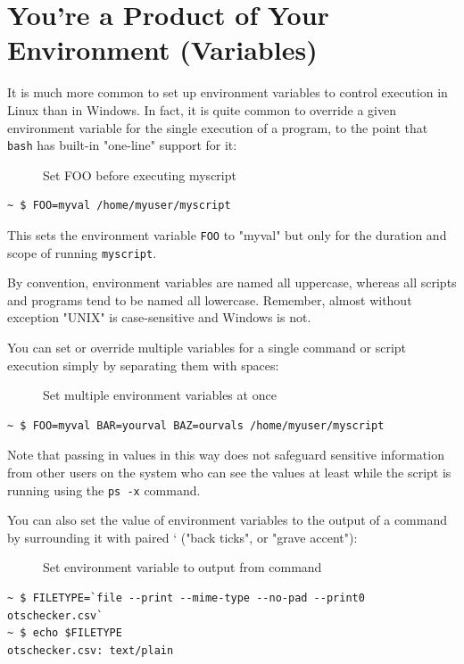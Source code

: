 \documentclass[10pt,]{book}
\numberwithin{figure}{chapter}
\DeclareRobustCommand{\drcap}[1]{\begin{figure}[H]\caption{#1}\end{figure}}
\begin{document}
\section*{You're a Product of Your Environment
(Variables)}\label{youre-a-product-of-your-environment-variables}

It is much more common to set up environment variables to control
execution in Linux than in Windows. In fact, it is quite common to
override a given environment variable for the single execution of a
program, to the point that \texttt{bash} has built-in "one-line" support
for it:

\drcap{Set FOO before executing myscript}

\begin{verbatim}
~ $ FOO=myval /home/myuser/myscript
\end{verbatim}

This sets the environment variable \texttt{FOO} to "myval" but only for
the duration and scope of running \texttt{myscript}.

By convention, environment variables are named all uppercase, whereas
all scripts and programs tend to be named all lowercase. Remember,
almost without exception "UNIX" is case-sensitive and Windows is not.

You can set or override multiple variables for a single command or
script execution simply by separating them with spaces:

\drcap{Set multiple environment variables at once}

\begin{verbatim}
~ $ FOO=myval BAR=yourval BAZ=ourvals /home/myuser/myscript
\end{verbatim}

Note that passing in values in this way does not safeguard sensitive
information from other users on the system who can see the values at
least while the script is running using the \texttt{ps -x} command.

You can also set the value of environment variables to the output of a
command by surrounding it with paired ` ("back ticks", or "grave
accent"):

\drcap{Set environment variable to output from command}

\begin{verbatim}
~ $ FILETYPE=`file --print --mime-type --no-pad --print0 otschecker.csv`
~ $ echo $FILETYPE
otschecker.csv: text/plain
\end{verbatim}
\end{document}
